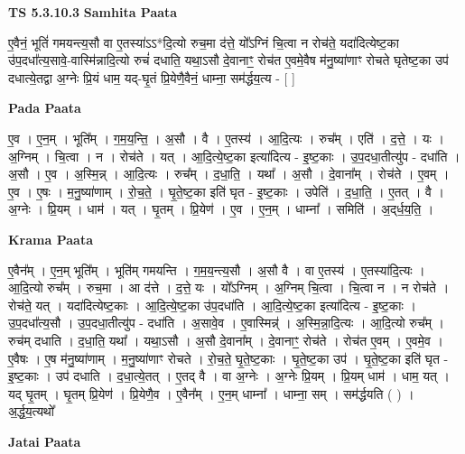 \documentclass[17pt]{extarticle}
\begin{document}
\textbf{TS 5.3.10.3 } \newline
\textbf{Samhita Paata} \newline

ए॒वैनं॒ भूतिं॑ गमयन्त्य॒सौ वा ए॒तस्या॑ऽऽ*दि॒त्यो रुच॒मा द॑त्ते॒ यो᳚ऽग्निं चि॒त्वा न रोच॑ते॒ यदा॑दित्येष्ट॒का उ॑प॒दधा᳚त्य॒सावे॒-वास्मि॑न्नादि॒त्यो रुचं॑ दधाति॒ यथा॒ऽसौ दे॒वानाꣳ॒॒ रोच॑त ए॒वमे॒वैष म॑नु॒ष्या॑णाꣳ रोचते घृतेष्ट॒का उप॑ दधात्ये॒तद्वा अ॒ग्नेः प्रि॒यं धाम॒ यद्-घृ॒तं प्रि॒येणै॒वैनं॒ धाम्ना॒ सम॑र्द्धय॒त्य - [  ] \newline

\textbf{Pada Paata} \newline

ए॒व । ए॒न॒म् । भूति᳚म् । ग॒म॒य॒न्ति॒ । अ॒सौ । वै । ए॒तस्य॑ । आ॒दि॒त्यः । रुच᳚म् । एति॑ । द॒त्ते॒ । यः । अ॒ग्निम् । चि॒त्वा । न । रोच॑ते । यत् । आ॒दि॒त्ये॒ष्ट॒का इत्या॑दित्य - इ॒ष्ट॒काः । उ॒प॒दधा॒तीत्यु॑प - दधा॑ति । अ॒सौ । ए॒व । अ॒स्मि॒न्न् । आ॒दि॒त्यः । रुच᳚म् । द॒धा॒ति॒ । यथा᳚ । अ॒सौ । दे॒वाना᳚म् । रोच॑ते । ए॒वम् । ए॒व । ए॒षः । म॒नु॒ष्या॑णाम् । रो॒च॒ते॒ । घृ॒ते॒ष्ट॒का इति॑ घृत - इ॒ष्ट॒काः । उपेति॑ । द॒धा॒ति॒ । ए॒तत् । वै । अ॒ग्नेः । प्रि॒यम् । धाम॑ । यत् । घृ॒तम् । प्रि॒येण॑ । ए॒व । ए॒न॒म् । धाम्ना᳚ । समिति॑ । अ॒द्‌र्ध॒य॒ति॒ ।  \newline


\textbf{Krama Paata} \newline

ए॒वैन᳚म् । ए॒न॒म् भूति᳚म् । भूति॑म् गमयन्ति । ग॒म॒य॒न्त्य॒सौ । अ॒सौ वै । वा ए॒तस्य॑ । ए॒तस्या॑दि॒त्यः । आ॒दि॒त्यो रुच᳚म् । रुच॒मा । आ द॑त्ते । द॒त्ते॒ यः । यो᳚ऽग्निम् । अ॒ग्निम् चि॒त्वा । चि॒त्वा न । न रोच॑ते । रोच॑ते॒ यत् । यदा॑दित्येष्ट॒काः । आ॒दि॒त्ये॒ष्ट॒का उ॑प॒दधा॑ति । आ॒दि॒त्ये॒ष्ट॒का इत्या॑दित्य - इ॒ष्ट॒काः । उ॒प॒दधा᳚त्य॒सौ । उ॒प॒दधा॒तीत्यु॑प - दधा॑ति । अ॒सावे॒व । ए॒वास्मिन्न्॑ । अ॒स्मि॒न्ना॒दि॒त्यः । आ॒दि॒त्यो रुच᳚म् । रुच॑म् दधाति । द॒धा॒ति॒ यथा᳚ । यथा॒ऽसौ । अ॒सौ दे॒वाना᳚म् । दे॒वानाꣳ॒॒ रोच॑ते । रोच॑त ए॒वम् । ए॒वमे॒व । ए॒वैषः । ए॒ष म॑नु॒ष्या॑णाम् । म॒नु॒ष्या॑णाꣳ रोचते । रो॒च॒ते॒ घृ॒ते॒ष्ट॒काः । घृ॒ते॒ष्ट॒का उप॑ । घृ॒ते॒ष्ट॒का इति॑ घृत - इ॒ष्ट॒काः । उप॑ दधाति । द॒धा॒त्ये॒तत् । ए॒तद् वै । वा अ॒ग्नेः । अ॒ग्नेः प्रि॒यम् । प्रि॒यम् धाम॑ । धाम॒ यत् । यद् घृ॒तम् । घृ॒तम् प्रि॒येण॑ । प्रि॒येणै॒व । ए॒वैन᳚म् । ए॒न॒म् धाम्ना᳚ । धाम्ना॒ सम् । सम॑र्द्धयति ( ) । अ॒र्द्ध॒य॒त्यथो᳚ \newline

\textbf{Jatai Paata} \newline
\end{document}
